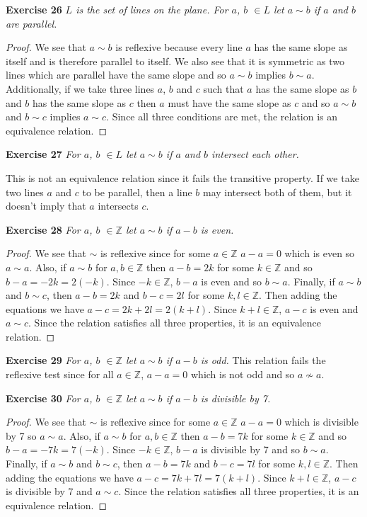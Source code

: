 \documentclass{article}
\begin{document}
\begin{flushleft}
\textbf{Exercise 26}
\textsl{$L$ is the set of lines on the plane. For $a$, $b$ $\in L$ let $a \sim b$ if $a$ and $b$ are parallel.}
\begin{proof}
We see that $a \sim b$ is reflexive because every line $a$ has the same slope as itself and is therefore parallel to itself. We also see that it is symmetric as two lines which are parallel have the same slope and so $a \sim b$ implies $b \sim a$. Additionally, if we take three lines $a$, $b$ and $c$ such that $a$ has the same slope as $b$ and $b$ has the same slope as $c$ then $a$ must have the same slope as $c$ and so $a \sim b$ and $b \sim c$ implies $a \sim c$. Since all three conditions are met, the relation is an equivalence relation.
\end{proof}

\textbf{Exercise 27}
\textsl{For $a$, $b$ $\in L$ let $a \sim b$ if $a$ and $b$ intersect each other.}\newline

This is not an equivalence relation since it fails the transitive property. If we take two lines $a$ and $c$ to be parallel, then a line $b$ may intersect both of them, but it doesn't imply that $a$ intersects $c$.\newline

\textbf{Exercise 28}
\textsl{For $a$, $b$ $\in \mathbb{Z}$ let $a \sim b$ if $a-b$ is even.}
\begin{proof}
We see that $\sim$ is reflexive since for some $a \in \mathbb{Z}$ $a-a=0$ which is even so $a \sim a$. Also, if $a \sim b$ for $a, b \in \mathbb{Z}$ then $a-b=2k$ for some $k \in \mathbb{Z}$ and so $b-a=-2k=2(-k)$. Since $-k \in \mathbb{Z}$, $b-a$ is even and so $b \sim a$. Finally, if $a \sim b$ and $b \sim c$, then $a-b=2k$ and $b-c=2l$ for some $k,l \in \mathbb{Z}$. Then adding the equations we have $a-c=2k+2l=2(k+l)$. Since $k+l \in \mathbb{Z}$, $a-c$ is even and $a \sim c$. Since the relation satisfies all three properties, it is an equivalence relation.
\end{proof}

\textbf{Exercise 29}
\textsl{For $a$, $b$ $\in \mathbb{Z}$ let $a \sim b$ if $a-b$ is odd.}\newline
This relation fails the reflexive test since for all $a \in \mathbb{Z}$, $a-a=0$ which is not odd and so $a \nsim a$.\newline

\textbf{Exercise 30}
\textsl{For $a$, $b$ $\in \mathbb{Z}$ let $a \sim b$ if $a-b$ is divisible by 7.}
\begin{proof}
We see that $\sim$ is reflexive since for some $a \in \mathbb{Z}$ $a-a=0$ which is divisible by 7 so $a \sim a$. Also, if $a \sim b$ for $a, b \in \mathbb{Z}$ then $a-b=7k$ for some $k \in \mathbb{Z}$ and so $b-a=-7k=7(-k)$. Since $-k \in \mathbb{Z}$, $b-a$ is divisible by 7 and so $b \sim a$. Finally, if $a \sim b$ and $b \sim c$, then $a-b=7k$ and $b-c=7l$ for some $k,l \in \mathbb{Z}$. Then adding the equations we have $a-c=7k+7l=7(k+l)$. Since $k+l \in \mathbb{Z}$, $a-c$ is divisible by 7 and $a \sim c$. Since the relation satisfies all three properties, it is an equivalence relation.
\end{proof}


\end{flushleft}
\end{document}
